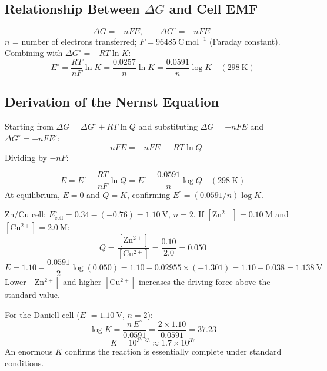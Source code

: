 \documentclass[12pt,a4paper]{article}
\begin{document}
\subsection{Relationship Between \texorpdfstring{$\Delta G$}{Delta G} and Cell EMF}
\begin{tcolorbox}[formulabox, title={Free Energy and EMF}]
\[
\Delta G = -nFE, \qquad \Delta G^\circ = -nFE^\circ
\]
$n$ = number of electrons transferred; $F = 96485\ \mathrm{C\,mol^{-1}}$ (Faraday constant).\\
Combining with $\Delta G^\circ = -RT\ln K$:
\[
E^\circ = \frac{RT}{nF}\ln K = \frac{0.0257}{n}\ln K = \frac{0.0591}{n}\log K \quad (298\ \mathrm{K})
\]
\end{tcolorbox}

\subsection{Derivation of the Nernst Equation}
Starting from $\Delta G = \Delta G^\circ + RT\ln Q$ and substituting $\Delta G = -nFE$ and $\Delta G^\circ = -nFE^\circ$:
\[
-nFE = -nFE^\circ + RT\ln Q
\]
Dividing by $-nF$:

\begin{tcolorbox}[formulabox, title={Nernst Equation}]
\[
E = E^\circ - \frac{RT}{nF}\ln Q = E^\circ - \frac{0.0591}{n}\log Q \quad (298\ \mathrm{K})
\]
At equilibrium, $E = 0$ and $Q = K$, confirming $E^\circ = (0.0591/n)\log K$.
\end{tcolorbox}

\begin{tcolorbox}[examplebox, title={Solved Example: Daniell Cell EMF via Nernst}]
Zn/Cu cell: $E^\circ_{\mathrm{cell}} = 0.34 - (-0.76) = 1.10\ \mathrm{V}$, $n=2$.
If $[\mathrm{Zn^{2+}}] = 0.10\ \mathrm{M}$ and $[\mathrm{Cu^{2+}}] = 2.0\ \mathrm{M}$:
\[
Q = \frac{[\mathrm{Zn^{2+}}]}{[\mathrm{Cu^{2+}}]} = \frac{0.10}{2.0} = 0.050
\]
\[
E = 1.10 - \frac{0.0591}{2}\log(0.050) = 1.10 - 0.02955\times(-1.301) = 1.10 + 0.038 = 1.138\ \mathrm{V}
\]
Lower $[\mathrm{Zn^{2+}}]$ and higher $[\mathrm{Cu^{2+}}]$ increases the driving force above the standard value.
\end{tcolorbox}

\begin{tcolorbox}[examplebox, title={Solved Example: Equilibrium Constant from \texorpdfstring{$E^\circ$}{E0}}]
For the Daniell cell ($E^\circ = 1.10\ \mathrm{V}$, $n=2$):
\[
\log K = \frac{n\,E^\circ}{0.0591} = \frac{2\times1.10}{0.0591} = 37.23
\]
\[
K = 10^{37.23} \approx 1.7\times10^{37}
\]
An enormous $K$ confirms the reaction is essentially complete under standard conditions.
\end{tcolorbox}
\end{document}
